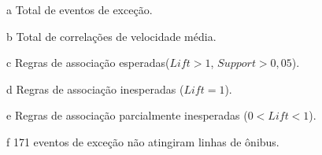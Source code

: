 \documentclass[
	12pt,				%
	oneside,			%
	a4paper,			%
	english,			%
	brazil				%
	]{abntex2ppgsi}
\begin{document}
{{\begin{apendicesenv}
\begin{table}[!htb]
\begin{threeparttable}
\begin{tablenotes}
            \item[a] Total de eventos de exceção.
            \item[b] Total de correlações de velocidade média.
            \item[c] Regras de associação esperadas($Lift > 1$, $Support > 0,05$).
            \item[d] Regras de associação inesperadas ($Lift = 1$).
            \item[e] Regras de associação parcialmente inesperadas ($0 < Lift < 1$).
            \item[f] 171 eventos de exceção não atingiram linhas de ônibus.
        \end{tablenotes}
\end{threeparttable}
\end{table}


\end{apendicesenv}}}
\end{document}
